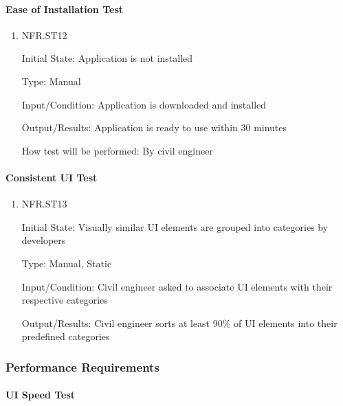 \documentclass[12pt, titlepage]{article}
\begin{document}
\paragraph{Ease of Installation Test}

\begin{enumerate}

\item{NFR.ST12\\}

Initial State: Application is not installed

Type: Manual

Input/Condition: Application is downloaded and installed

Output/Results: Application is ready to use within 30 minutes

How test will be performed: By civil engineer

\end{enumerate}

\paragraph{Consistent UI Test}

\begin{enumerate}

\item{NFR.ST13\\}

Initial State: Visually similar UI elements are grouped into categories by developers

Type: Manual, Static

Input/Condition: Civil engineer asked to associate UI elements with their respective categories

Output/Results: Civil engineer sorts at least 90\% of UI elements into their predefined categories

\end{enumerate}

\subsubsection{Performance Requirements}

\paragraph{UI Speed Test}
\end{document}

